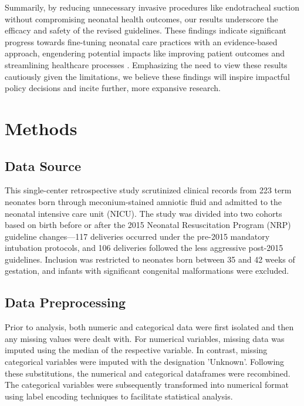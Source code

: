 \documentclass[11pt]{article}
\begin{document}
Summarily, by reducing unnecessary invasive procedures like endotracheal suction without compromising neonatal health outcomes, our results underscore the efficacy and safety of the revised guidelines. These findings indicate significant progress towards fine-tuning neonatal care practices with an evidence-based approach, engendering potential impacts like improving patient outcomes and streamlining healthcare processes \cite{Davidson2017GuidelinesFF}. Emphasizing the need to view these results cautiously given the limitations, we believe these findings will inspire impactful policy decisions and incite further, more expansive research.

\section*{Methods}

\subsection*{Data Source}
This single-center retrospective study scrutinized clinical records from 223 term neonates born through meconium-stained amniotic fluid and admitted to the neonatal intensive care unit (NICU). The study was divided into two cohorts based on birth before or after the 2015 Neonatal Resuscitation Program (NRP) guideline changes—117 deliveries occurred under the pre-2015 mandatory intubation protocols, and 106 deliveries followed the less aggressive post-2015 guidelines. Inclusion was restricted to neonates born between 35 and 42 weeks of gestation, and infants with significant congenital malformations were excluded.

\subsection*{Data Preprocessing}
Prior to analysis, both numeric and categorical data were first isolated and then any missing values were dealt with. For numerical variables, missing data was imputed using the median of the respective variable. In contrast, missing categorical variables were imputed with the designation 'Unknown'. Following these substitutions, the numerical and categorical dataframes were recombined. The categorical variables were subsequently transformed into numerical format using label encoding techniques to facilitate statistical analysis.
\end{document}

